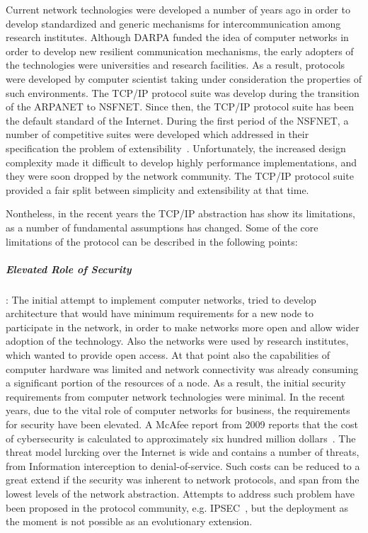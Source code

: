 Current network technologies were developed a number of years ago in order to
develop standardized and generic mechanisms for intercommunication among
research institutes. Although DARPA funded the idea of computer networks in
order to develop new resilient communication mechanisms, the early adopters of
the technologies were universities and research facilities. As a result,
protocols were developed by computer scientist taking under consideration the
properties of such environments. The TCP/IP protocol suite was develop during
the transition of the ARPANET to NSFNET. Since then, the TCP/IP protocol suite
has been the default standard of the Internet.  During the first period of the
NSFNET, a number of competitive suites were developed which addressed in their
specification the problem of extensibility~.  Unfortunately, the increased design complexity made it
difficult to develop highly performance implementations, and they were soon
dropped by the network community. The TCP/IP protocol suite provided a fair
split between simplicity and extensibility at that time.

Nontheless, in the recent years the TCP/IP abstraction has show its limitations, as
a number of fundamental assumptions has changed. Some of the core limitations of
the protocol can be described in the following points:

\subparagraph*{Elevated Role of Security}: 
The initial attempt to implement computer networks, tried to develop
architecture that would have minimum requirements for a new node to participate
in the network, in order to make networks more open and allow wider adoption of
the technology. Also the networks were used by research institutes, which wanted
to provide open access. At that point also the capabilities of computer hardware
was limited and network connectivity was already consuming a significant portion
of the resources of a node. As a result, the initial security requirements from
computer network technologies were minimal. In the recent years, due to the
vital role of computer networks for business, the requirements for security have
been elevated. A McAfee report from 2009 reports that the cost of cybersecurity
is calculated to approximately six hundred million
dollars~\cite{Acherman:2009wf}. The threat model lurcking over the Internet is
wide and contains a number of threats, from Information interception to
denial-of-service. Such costs can be reduced to a great extend if
the security was inherent to network protocols, and span from the lowest levels
of the network abstraction. Attempts to address such problem have been proposed
in the protocol community, e.g. IPSEC~\cite{RFC2401}, but the deployment as the
moment is not possible as an evolutionary extension.

